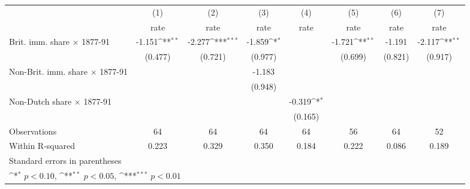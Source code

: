 {
\def\sym#1{\ifmmode^{#1}\else\(^{#1}\)\fi}
\begin{tabular}{l*{7}{c}}
\hline\hline
                    &\multicolumn{1}{c}{(1)}&\multicolumn{1}{c}{(2)}&\multicolumn{1}{c}{(3)}&\multicolumn{1}{c}{(4)}&\multicolumn{1}{c}{(5)}&\multicolumn{1}{c}{(6)}&\multicolumn{1}{c}{(7)}\\
                    &\multicolumn{1}{c}{rate}&\multicolumn{1}{c}{rate}&\multicolumn{1}{c}{rate}&\multicolumn{1}{c}{rate}&\multicolumn{1}{c}{rate}&\multicolumn{1}{c}{rate}&\multicolumn{1}{c}{rate}\\
\hline
Brit. imm. share $\times$ 1877-91&      -1.151\sym{**} &      -2.277\sym{***}&      -1.859\sym{*}  &                     &      -1.721\sym{**} &      -1.191         &      -2.117\sym{**} \\
                    &     (0.477)         &     (0.721)         &     (0.977)         &                     &     (0.699)         &     (0.821)         &     (0.917)         \\
[1em]
Non-Brit. imm. share $\times$ 1877-91&                     &                     &      -1.183         &                     &                     &                     &                     \\
                    &                     &                     &     (0.948)         &                     &                     &                     &                     \\
[1em]
Non-Dutch share $\times$ 1877-91&                     &                     &                     &      -0.319\sym{*}  &                     &                     &                     \\
                    &                     &                     &                     &     (0.165)         &                     &                     &                     \\
\hline
Observations        &          64         &          64         &          64         &          64         &          56         &          64         &          52         \\
Within R-squared    &       0.223         &       0.329         &       0.350         &       0.184         &       0.222         &       0.086         &       0.189         \\
\hline\hline
\multicolumn{8}{l}{\footnotesize Standard errors in parentheses}\\
\multicolumn{8}{l}{\footnotesize \sym{*} \(p<0.10\), \sym{**} \(p<0.05\), \sym{***} \(p<0.01\)}\\
\end{tabular}
}
